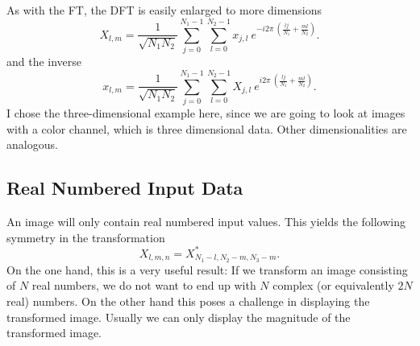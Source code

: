As with the FT, the DFT is easily enlarged to more dimensions
\begin{equation}
    X_{l,m} = \frac{1}{\sqrt{N_1N_2}}\sum_{j=0}^{N_1-1}\sum_{l=0}^{N_2-1}x_{j,l} \ e^{-i{2\pi}\ \left(\!\frac{lj}{N_1}+\frac{ml}{N_2}\right)}.
\end{equation}
and the inverse
\begin{equation}
    x_{l,m} = \frac{1}{\sqrt{N_1N_2}}\sum_{j=0}^{N_1-1}\sum_{l=0}^{N_2-1} X_{j,l} \ e^{i{2\pi}\ \left(\!\frac{lj}{N_1}+\frac{ml}{N_2}\right)}.
\end{equation}
I chose the three-dimensional example here, since we are going to look at images with a color channel, which is three dimensional data.
Other dimensionalities are analogous.

\subsection{Real Numbered Input Data}
An image will only contain real numbered input values. This yields the following symmetry in the transformation
\begin{equation}
    X_{l,m,n} = X^*_{N_1-l,N_2-m,N_3-m}.
    \label{eqn:realFSymmetry}
\end{equation}
On the one hand, this is a very useful result: If we transform an image consisting of $N$ real numbers,
we do not want to end up with $N$ complex (or equivalently $2N$ real) numbers.
On the other hand this poses a challenge in displaying the transformed image.
Usually we can only display the magnitude of the transformed image.

